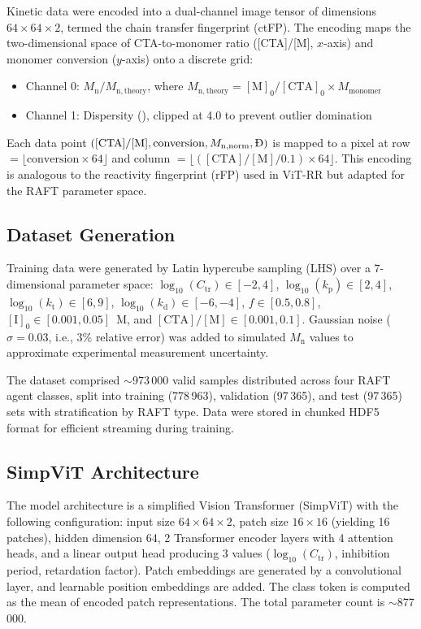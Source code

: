 \documentclass[journal=mamobx,manuscript=article]{achemso}
\begin{document}
Kinetic data were encoded into a dual-channel image tensor of dimensions $64 \times 64 \times 2$, termed the chain transfer fingerprint (ctFP). The encoding maps the two-dimensional space of CTA-to-monomer ratio ([CTA]/[M], $x$-axis) and monomer conversion ($y$-axis) onto a discrete grid:
\begin{itemize}
    \item Channel 0: $M_\mathrm{n}/M_\mathrm{n,theory}$, where $M_\mathrm{n,theory} = [\mathrm{M}]_0/[\mathrm{CTA}]_0 \times M_\mathrm{monomer}$
    \item Channel 1: Dispersity (\DJ), clipped at 4.0 to prevent outlier domination
\end{itemize}

Each data point $([\mathrm{CTA}]/[\mathrm{M}], \text{conversion}, M_\mathrm{n,norm}, \text{\DJ})$ is mapped to a pixel at row $= \lfloor \text{conversion} \times 64 \rfloor$ and column $= \lfloor ([\mathrm{CTA}]/[\mathrm{M}]/0.1) \times 64 \rfloor$. This encoding is analogous to the reactivity fingerprint (rFP) used in ViT-RR\cite{ViTRR2025} but adapted for the RAFT parameter space.

\subsection{Dataset Generation}

Training data were generated by Latin hypercube sampling (LHS) over a 7-dimensional parameter space: $\log_{10}(C_\mathrm{tr}) \in [-2, 4]$, $\log_{10}(k_\mathrm{p}) \in [2, 4]$, $\log_{10}(k_\mathrm{t}) \in [6, 9]$, $\log_{10}(k_\mathrm{d}) \in [-6, -4]$, $f \in [0.5, 0.8]$, $[\mathrm{I}]_0 \in [0.001, 0.05]$~M, and $[\mathrm{CTA}]/[\mathrm{M}] \in [0.001, 0.1]$. Gaussian noise ($\sigma = 0.03$, i.e., 3\% relative error) was added to simulated $M_\mathrm{n}$ values to approximate experimental measurement uncertainty.

The dataset comprised $\sim$973\,000 valid samples distributed across four RAFT agent classes, split into training (778\,963), validation (97\,365), and test (97\,365) sets with stratification by RAFT type. Data were stored in chunked HDF5 format for efficient streaming during training.

\subsection{SimpViT Architecture}

The model architecture is a simplified Vision Transformer (SimpViT)\cite{ViTRR2025} with the following configuration: input size $64 \times 64 \times 2$, patch size $16 \times 16$ (yielding 16 patches), hidden dimension 64, 2 Transformer encoder layers with 4 attention heads, and a linear output head producing 3 values ($\log_{10}(C_\mathrm{tr})$, inhibition period, retardation factor). Patch embeddings are generated by a convolutional layer, and learnable position embeddings are added. The class token is computed as the mean of encoded patch representations. The total parameter count is $\sim$877\,000.
\end{document}
